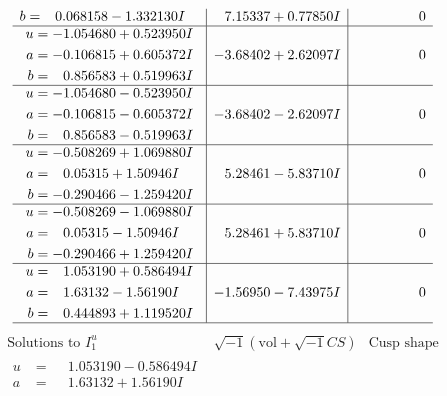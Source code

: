 \documentclass[1p]{elsarticle_modified}
\theoremstyle{definition}
\newcommand{\I}{\sqrt{-1}}
\begin{document}
$$\begin{array}{c|c|c}
\begin{aligned}
b &= \phantom{-}0.068158 - 1.332130 I\end{aligned}
 & \phantom{-}7.15337 + 0.77850 I & \phantom{-0.000000 } 0 \\ \hline\begin{aligned}
u &= -1.054680 + 0.523950 I \\
a &= -0.106815 + 0.605372 I \\
b &= \phantom{-}0.856583 + 0.519963 I\end{aligned}
 & -3.68402 + 2.62097 I & \phantom{-0.000000 } 0 \\ \hline\begin{aligned}
u &= -1.054680 - 0.523950 I \\
a &= -0.106815 - 0.605372 I \\
b &= \phantom{-}0.856583 - 0.519963 I\end{aligned}
 & -3.68402 - 2.62097 I & \phantom{-0.000000 } 0 \\ \hline\begin{aligned}
u &= -0.508269 + 1.069880 I \\
a &= \phantom{-}0.05315 + 1.50946 I \\
b &= -0.290466 - 1.259420 I\end{aligned}
 & \phantom{-}5.28461 - 5.83710 I & \phantom{-0.000000 } 0 \\ \hline\begin{aligned}
u &= -0.508269 - 1.069880 I \\
a &= \phantom{-}0.05315 - 1.50946 I \\
b &= -0.290466 + 1.259420 I\end{aligned}
 & \phantom{-}5.28461 + 5.83710 I & \phantom{-0.000000 } 0 \\ \hline\begin{aligned}
u &= \phantom{-}1.053190 + 0.586494 I \\
a &= \phantom{-}1.63132 - 1.56190 I \\
b &= \phantom{-}0.444893 + 1.119520 I\end{aligned}
 & -1.56950 - 7.43975 I & \phantom{-0.000000 } 0\\
 \hline 
 \end{array}$$\newpage$$\begin{array}{c|c|c}  
\text{Solutions to }I^u_{1}& \I (\text{vol} + \sqrt{-1}CS) & \text{Cusp shape}\\
 \hline 
\begin{aligned}
u &= \phantom{-}1.053190 - 0.586494 I \\
a &= \phantom{-}1.63132 + 1.56190 I \\

\end{aligned}
\end{array}$$
\end{document}
